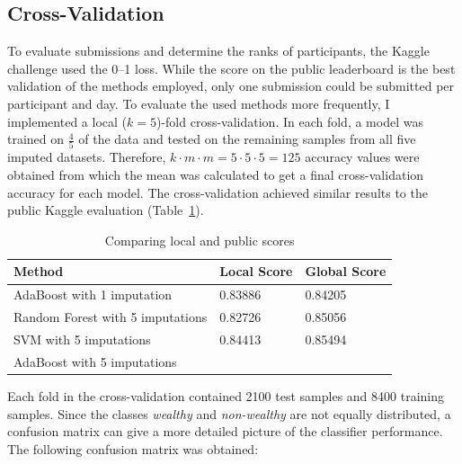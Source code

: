 \documentclass[a4paper]{article}
\begin{document}
\subsection{Cross-Validation}
\label{sec:cross}

To evaluate submissions and determine the ranks of participants, the
Kaggle challenge used the 0--1 loss. While the score on the public
leaderboard is the best validation of the methods employed, only one
submission could be submitted per participant and day. To evaluate the
used methods more frequently, I implemented a local ($k = 5$)-fold
cross-validation. In each fold, a model was trained on $\frac{4}{5}$
of the data and tested on the remaining samples from all five imputed
datasets. Therefore, $k \cdot m \cdot m = 5 \cdot 5 \cdot 5 = 125$
accuracy values were obtained from which the mean was calculated to
get a final cross-validation accuracy for each model. The
cross-validation achieved similar results to the public Kaggle
evaluation (Table~\ref{tab:localpublic}).

\begin{table}[h]
  \centering
  \begin{tabular}{lll}
    \toprule
    Method & Local Score & Global Score\\
    \midrule
    AdaBoost with 1 imputation & 0.83886 & 0.84205\\
    Random Forest with 5 imputations & 0.82726 & 0.85056\\
    SVM with 5 imputations & 0.84413 & 0.85494\\
    AdaBoost with 5 imputations & & \\
    \bottomrule
  \end{tabular}
  \caption{{Comparing local and public scores}}
  \label{tab:localpublic}
\end{table}

Each fold in the cross-validation contained 2100 test samples and
8400 training samples. Since the classes \emph{wealthy} and
\emph{non-wealthy} are not equally distributed, a confusion matrix can
give a more detailed picture of the classifier performance. The
following confusion matrix was obtained:
\end{document}
